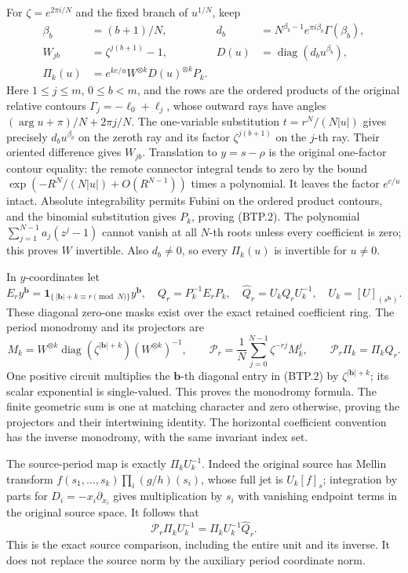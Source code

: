 For \(\zeta=e^{2\pi i/N}\) and the fixed branch of
\(u^{1/N}\), keep
\[
\begin{aligned}
 \beta_b&=(b+1)/N,&
 d_b&=N^{\beta_b-1}e^{\pi i\beta_b}\Gamma(\beta_b),\\
 W_{jb}&=\zeta^{j(b+1)}-1,&
 D(u)&=\operatorname{diag}(d_bu^{\beta_b}),\\
 \Pi_k(u)&=e^{kc/u}W^{\otimes k}D(u)^{\otimes k}P_k .
\end{aligned}
\tag{BTP.2}\label{eq:btp2}
\]
Here \(1\leq j\leq m\), \(0\leq b<m\), and the rows are
the ordered products of the original relative contours
\(\Gamma_j=-\ell_0+\ell_j\), whose outward rays have angles
\((\arg u+\pi)/N+2\pi j/N\).  The one-variable substitution
\(t=r^N/(N|u|)\) gives precisely \(d_bu^{\beta_b}\) on
the zeroth ray and its factor \(\zeta^{j(b+1)}\) on the
\(j\)-th ray.  Their oriented difference gives \(W_{jb}\).
Translation to \(y=s-\rho\) is the original one-factor
contour equality: the remote connector integral tends to
zero by the bound
\(\exp(-R^N/(N|u|)+O(R^{N-1}))\) times a polynomial.
It leaves the factor \(e^{c/u}\) intact.  Absolute
integrability permits Fubini on the ordered product contours,
and the binomial substitution gives \(P_k\), proving (BTP.2).
The polynomial \(\sum_{j=1}^{N-1}a_j(z^j-1)\) cannot vanish
at all \(N\)-th roots unless every coefficient is zero;
this proves \(W\) invertible.  Also \(d_b\ne0\), so every
\(\Pi_k(u)\) is invertible for \(u\ne0\).

In \(y\)-coordinates let
\[
 E_r y^{\mathbf b}
       =\mathbf1_{\{\,|\mathbf b|+k\equiv r\pmod N\}}y^{\mathbf b},
 \quad Q_r=P_k^{-1}E_rP_k,
 \quad \widehat Q_r=U_kQ_rU_k^{-1},
 \quad U_k=[U]_{(s^{\mathbf b})}.
\tag{BTP.3}\label{eq:btp3}
\]
These diagonal zero-one masks exist over the exact retained
coefficient ring.  The period monodromy and its projectors are
\[
 M_k=W^{\otimes k}
    \operatorname{diag}(\zeta^{|\mathbf b|+k})
                (W^{\otimes k})^{-1},
 \qquad
 \mathcal P_r=\frac1N\sum_{j=0}^{N-1}\zeta^{-rj}M_k^j,
 \qquad
 \mathcal P_r\Pi_k=\Pi_kQ_r.
\tag{BTP.4}\label{eq:btp4}
\]
One positive circuit multiplies the \(\mathbf b\)-th
diagonal entry in (BTP.2) by \(\zeta^{|\mathbf b|+k}\);
its scalar exponential is single-valued.  This proves the
monodromy formula.  The finite geometric sum is one at
matching character and zero otherwise, proving the
projectors and their intertwining identity.  The horizontal
coefficient convention has the inverse monodromy, with the
same invariant index set.

The source-period map is exactly \(\Pi_kU_k^{-1}\).
Indeed the original source has Mellin transform
\(f(s_1,\ldots,s_k)\prod_i(g/h)(s_i)\), whose full jet
is \(U_k[f]_s\); integration by parts for
\(D_i=-x_i\partial_{x_i}\) gives multiplication by \(s_i\)
with vanishing endpoint terms in the original source space.
It follows that
\[
 \mathcal P_r\Pi_kU_k^{-1}
       =\Pi_kU_k^{-1}\widehat Q_r.
\tag{BTP.5}\label{eq:btp5}
\]
This is the exact source comparison, including the entire
unit and its inverse.  It does not replace the source norm
by the auxiliary period coordinate norm.

